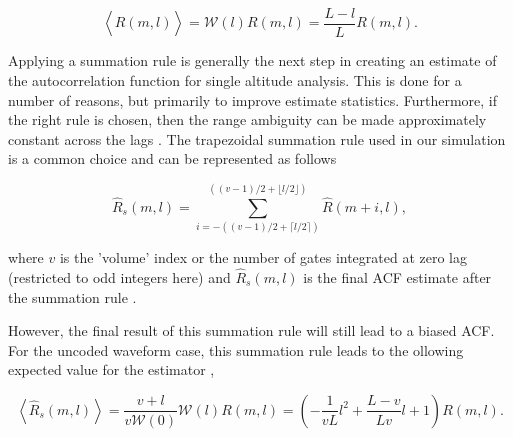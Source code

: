 \begin{equation}
\label{eq:lagprobias}
\left\langle\widehat{R}(m,l) \right\rangle = \mathcal{W}(l)R(m,l) =\frac{L-l}{L}R(m,l).
\end{equation}
%
%

Applying a summation rule is generally the next step in creating an estimate of the autocorrelation function for single altitude analysis. This is done for a number of reasons, but primarily to improve estimate statistics.  Furthermore, if the right rule is chosen, then the range ambiguity can be made approximately constant across the lags \cite{nygren1996}. The trapezoidal summation rule used in our simulation is a common choice and can be represented as follows

\begin{equation}
\label{eq:sumrule}
\widehat{R}_s(m,l) = \displaystyle\sum\limits_{i=-((v-1)/2+\lceil l/2 \rceil)}^{((v-1)/2+\lfloor l/2\rfloor)} \widehat{R}(m+i,l),
\end{equation}

\noindent where $v$ is the 'volume' index or the number of gates integrated at zero lag (restricted to odd integers here) and $\widehat{R}_s(m,l)$ is the final ACF estimate after the summation rule \cite{nygren1996}. 

However, the final result of this summation rule will still lead to a biased ACF. For the uncoded waveform case, this summation rule leads to the ollowing expected value for the estimator \cite{nygren1996},

\begin{equation}
\label{eq:sumruleest}
\left\langle\widehat{R}_s(m,l) \right\rangle  =\frac{v+l}{v\mathcal{W}(0)}\mathcal{W}(l)R(m,l) =\left(-\frac{1}{vL}l^2+\frac{L-v}{Lv}l+1\right)   R(m,l).
\end{equation}

